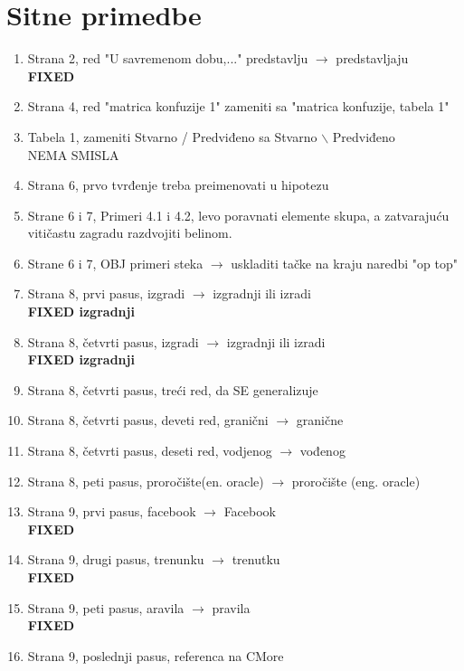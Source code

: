 \documentclass[a4paper]{report}
\begin{document}
\section{Sitne primedbe}

\begin{enumerate}
\item Strana 2, red "U savremenom dobu,..." predstavlju $\rightarrow$ predstavljaju
\\ \textbf{FIXED}
\item Strana 4, red "matrica konfuzije 1" zameniti sa "matrica konfuzije, tabela 1"
\item Tabela 1, zameniti Stvarno / Predviđeno sa Stvarno $\backslash$ Predviđeno
\\ NEMA SMISLA
\item Strana 6, prvo tvrđenje treba preimenovati u hipotezu
\item Strane 6 i 7, Primeri 4.1 i 4.2, levo poravnati elemente skupa,
a zatvarajuću vitičastu zagradu razdvojiti belinom.
\item Strane 6 i 7, OBJ primeri steka $\rightarrow$ uskladiti tačke na kraju naredbi "op top"
\item Strana 8, prvi pasus, izgradi $\rightarrow$ izgradnji ili izradi
\\ \textbf{FIXED izgradnji}
\item Strana 8, četvrti pasus, izgradi $\rightarrow$ izgradnji ili izradi
\\ \textbf{FIXED izgradnji}
\item Strana 8, četvrti pasus, treći red, da SE generalizuje
\item Strana 8, četvrti pasus, deveti red, granični $\rightarrow$ granične
\item Strana 8, četvrti pasus, deseti red, vodjenog $\rightarrow$ vođenog
\item Strana 8, peti pasus, proročište(en. oracle) $\rightarrow$ proročište (eng. oracle)
\item Strana 9, prvi pasus, facebook $\rightarrow$ Facebook
\\ \textbf{FIXED}
\item Strana 9, drugi pasus, trenunku $\rightarrow$ trenutku
\\ \textbf{FIXED}
\item Strana 9, peti pasus, aravila $\rightarrow$ pravila
\\ \textbf{FIXED}
\item Strana 9, poslednji pasus, referenca na CMore

\end{enumerate}
\end{document}
